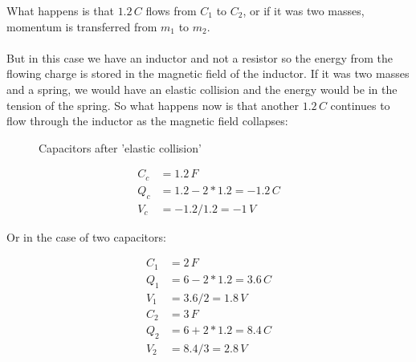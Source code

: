 \documentclass[]{../common/elementary-physics}
\begin{document}
What happens is that $1.2 \, C$ flows from $C_1$ to $C_2$, or if it was two masses, momentum is transferred from $m_1$ to $m_2$.\\
\\
But in this case we have an inductor and not a resistor so the energy from the flowing charge is stored in the magnetic field of the inductor.
If it was two masses and a spring, we would have an elastic collision and the energy would be in the tension of the spring.
So what happens now is that another $1.2 \, C$ continues to flow through the inductor as the magnetic field collapses:

\begin{figure}[ht] \centering
	\qquad
	\caption{Capacitors after 'elastic collision'}
\end{figure}

\begin{subequations}
\begin{align}
C_c &= 1.2 \, F \\
Q_c &= 1.2 - 2*1.2 = -1.2 \, C \\
V_c &= -1.2 / 1.2 = -1 \, V
\end{align}
\end{subequations}

Or in the case of two capacitors:

\begin{subequations}
\begin{align}
C_1 &= 2 \, F \\
Q_1 &= 6 - 2*1.2 = 3.6 \, C \\
V_1 &= 3.6 / 2 = 1.8 \, V \\
C_2 &= 3 \, F \\
Q_2 &= 6 + 2*1.2 = 8.4 \, C \\
V_2 &= 8.4 / 3 = 2.8 \, V 
\end{align}
\end{subequations}
\end{document}
